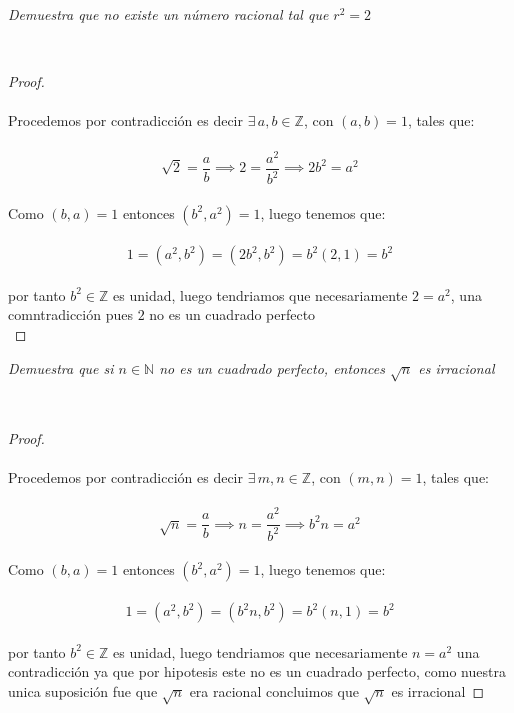 \documentclass[11pt,letterpaper]{article}
\newcommand{\N}{\mathbb{N}}
\newcommand{\Z}{\mathbb{Z}}
\begin{document}
\begin{tcolorbox}[
	title = \textcolor{black}{\textcolor{white}{Problema 10}},]
\textit{
Demuestra que no existe un n\'umero racional tal que $r^2=2$
}
\end{tcolorbox}\,\\
\begin{proof}\,\\
    \,\\
Procedemos por contradicci\'on es decir $\exists\,a,b\in \Z$, con $(a,b)=1$, tales que:\,\\
    \,\\
    \begin{equation*}
        \sqrt{2}=\frac{a}{b} \implies 2=\frac{a^2}{b^2}\implies 2b^2=a^2
    \end{equation*}\,\\
    Como $(b,a)=1$ entonces $(b^2,a^2)=1$, luego tenemos que:\,\\
    \,\\
    \begin{equation*}
        1=(a^2,b^2)=(2b^2,b^2)=b^2(2,1)=b^2
    \end{equation*}\,\\
    por tanto $b^2\in\Z$ es unidad, luego tendriamos que necesariamente $2=a^2$, una comntradicci\'on pues $2$ no es un cuadrado perfecto
    \,\\
\end{proof}
\newpage
\begin{tcolorbox}[
	title = \textcolor{black}{\textcolor{white}{Problema 11}},]
\textit{
Demuestra que si $n\in \N$ no es un cuadrado perfecto, entonces $\sqrt{n}$ es irracional
}
\end{tcolorbox}\,\\
\begin{proof}\,\\
    \,\\
    Procedemos por contradicci\'on es decir $\exists\,m,n\in \Z$, con $(m,n)=1$, tales que:\,\\
    \,\\
    \begin{equation*}
        \sqrt{n}=\frac{a}{b} \implies n=\frac{a^2}{b^2}\implies b^2n=a^2
    \end{equation*}\,\\
    Como $(b,a)=1$ entonces $(b^2,a^2)=1$, luego tenemos que:\,\\
    \,\\
    \begin{equation*}
        1=(a^2,b^2)=(b^2n,b^2)=b^2(n,1)=b^2
    \end{equation*}\,\\
    por tanto $b^2\in\Z$ es unidad, luego tendriamos que necesariamente $n=a^2$ una contradicci\'on
    ya que por hipotesis este no es un cuadrado perfecto, como nuestra unica suposici\'on fue que $\sqrt{n}$
    era racional concluimos que $\sqrt{n}$ es irracional
\end{proof}\,\\
\end{document}
